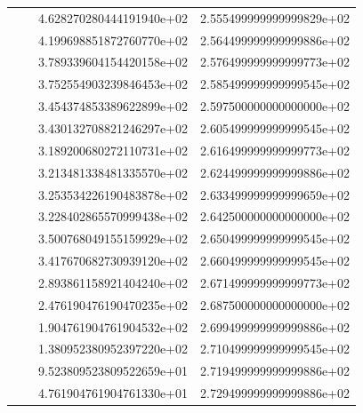 \begin{table}
\begin{tabular}{|S[round-precision = 2]|S|S[round-precision = 2]|S|}
     &  & 4.628270280444191940e+02 & 2.555499999999999829e+02\\
     &  & 4.199698851872760770e+02 & 2.564499999999999886e+02\\
     &  & 3.789339604154420158e+02 & 2.576499999999999773e+02\\
     &  & 3.752554903239846453e+02 & 2.585499999999999545e+02\\
     &  & 3.454374853389622899e+02 & 2.597500000000000000e+02\\
     &  & 3.430132708821246297e+02 & 2.605499999999999545e+02\\
     &  & 3.189200680272110731e+02 & 2.616499999999999773e+02\\
     &  & 3.213481338481335570e+02 & 2.624499999999999886e+02\\
     &  & 3.253534226190483878e+02 & 2.633499999999999659e+02\\
     &  & 3.228402865570999438e+02 & 2.642500000000000000e+02\\
     &  & 3.500768049155159929e+02 & 2.650499999999999545e+02\\
    &  & 3.417670682730939120e+02 & 2.660499999999999545e+02\\
     &  & 2.893861158921404240e+02 & 2.671499999999999773e+02\\
     &  & 2.476190476190470235e+02 & 2.687500000000000000e+02\\
     &  & 1.904761904761904532e+02 & 2.699499999999999886e+02\\
     &  & 1.380952380952397220e+02 & 2.710499999999999545e+02\\
     & & 9.523809523809522659e+01 & 2.719499999999999886e+02\\
     & & 4.761904761904761330e+01 & 2.729499999999999886e+02\\
     \bottomrule
  \end{tabular}
  \label{tab:tau}

\end{table}

